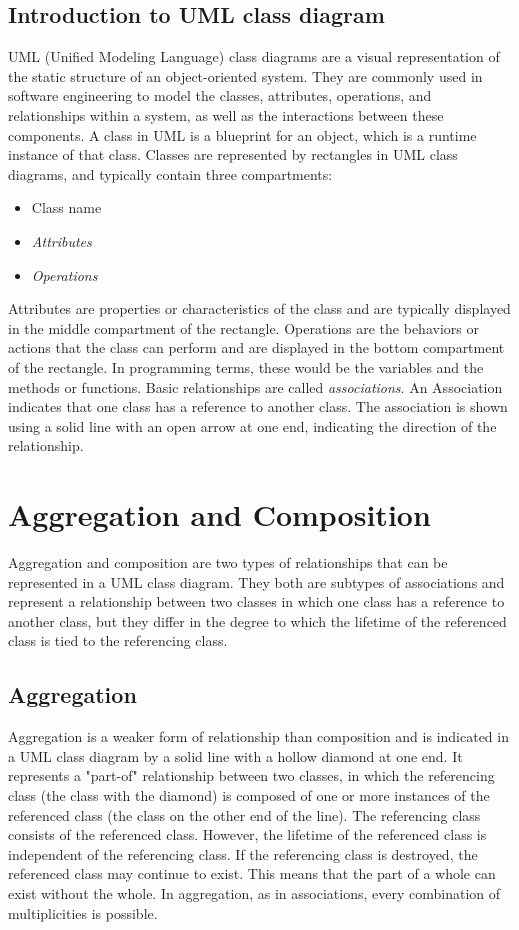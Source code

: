 \documentclass[
	12pt,
    a4paper,
    egregdoesnotlikesansseriftitles, %
    toc=chapterentrywithdots,
    oneside, openany,
    titlepage,
    parskip=half,
    headings=normal,  %
    listof=totoc,
    bibliography=totocnumbered,
    index=totoc,
    captions=tableheading,  %
    listof=flat,
    numbers=noenddot, %
    final]
    {scrbook}
\begin{document}
\section{Introduction to UML class diagram}
UML (Unified Modeling Language) class diagrams are a visual representation of the static structure of an object-oriented system. 
They are commonly used in software engineering to model the classes, attributes, operations, and relationships within a system, as well as the interactions between these components. 
A class in UML is a blueprint for an object, which is a runtime instance of that class. 
Classes are represented by rectangles in UML class diagrams, and typically contain three compartments: 
\begin{itemize}
	\item Class name
	\item \emph{Attributes}
	\item \emph{Operations}
\end{itemize}
Attributes are properties or characteristics of the class and are typically displayed in the middle compartment of the rectangle.
Operations are the behaviors or actions that the class can perform and are displayed in the bottom compartment of the rectangle.
In programming terms, these would be the variables and the methods or functions.
Basic relationships are called \emph{associations}. 
An Association indicates that one class has a reference to another class. \cite[p. 108-111]{uml}
The association is shown using a solid line with an open arrow at one end, indicating the direction of the relationship. \cite[p. 142-143]{uml}

\chapter{Aggregation and Composition}
Aggregation and composition are two types of relationships that can be represented in a UML class diagram. 
They both are subtypes of associations and represent a relationship between two classes in which one class has a reference to another class, but they differ in the degree to which the lifetime of the referenced class is tied to the referencing class.

\section{Aggregation}
Aggregation is a weaker form of relationship than composition and is indicated in a UML class diagram by a solid line with a hollow diamond at one end. 
It represents a "part-of" relationship between two classes, in which the referencing class (the class with the diamond) is composed of one or more instances of the referenced class (the class on the other end of the line).
The referencing class consists of the referenced class.
However, the lifetime of the referenced class is independent of the referencing class.
If the referencing class is destroyed, the referenced class may continue to exist.
This means that the part of a whole can exist without the whole.
In aggregation, as in associations, every combination of multiplicities is possible. \cite[p. 153]{uml}
\end{document}
